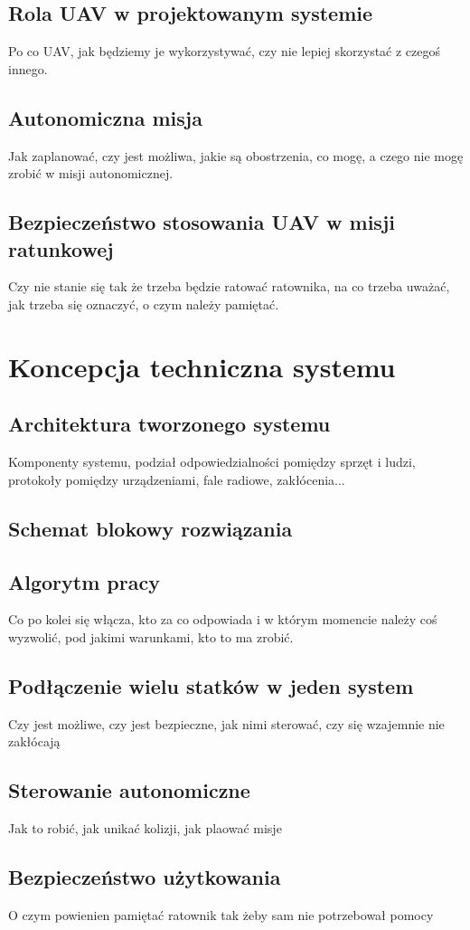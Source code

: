 \subsection{Rola UAV w projektowanym systemie}
Po co UAV, jak będziemy je wykorzystywać, czy nie lepiej skorzystać z czegoś innego.
\subsection{Autonomiczna misja}
Jak zaplanować, czy jest możliwa, jakie są obostrzenia, co mogę, a czego nie mogę zrobić w misji autonomicznej.
\subsection{Bezpieczeństwo stosowania UAV w misji ratunkowej}
Czy nie stanie się tak że trzeba będzie ratować ratownika, na co trzeba uważać, jak trzeba się oznaczyć, o czym należy pamiętać.

\section{Koncepcja techniczna systemu}
\subsection{Architektura tworzonego systemu}
Komponenty systemu, podział odpowiedzialności pomiędzy sprzęt i ludzi, protokoły pomiędzy urządzeniami, fale radiowe, zakłócenia...
\subsection{Schemat blokowy rozwiązania}
\subsection{Algorytm pracy}
Co po kolei się włącza, kto za co odpowiada i w którym momencie należy coś wyzwolić, pod jakimi warunkami, kto to ma zrobić.
\subsection{Podłączenie wielu statków w jeden system}
Czy jest możliwe, czy jest bezpieczne, jak nimi sterować, czy się wzajemnie nie zakłócają
\subsection{Sterowanie autonomiczne}
Jak to robić, jak unikać kolizji, jak plaować misje
\subsection{Bezpieczeństwo użytkowania}
O czym powienien pamiętać ratownik tak żeby sam nie potrzebował pomocy
